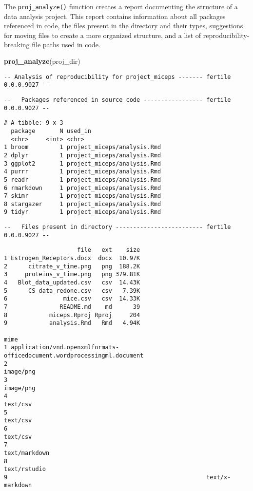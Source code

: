 \documentclass[12pt,twoside]{reedthesis}
\newenvironment{Shaded}{\begin{snugshade}}{\end{snugshade}}
\newcommand{\KeywordTok}[1]{\textcolor[rgb]{0.13,0.29,0.53}{\textbf{#1}}}
\newcommand{\NormalTok}[1]{#1}
\begin{document}
The \texttt{proj\_analyze()} function creates a report documenting the
structure of a data analysis project. This report contains information
about all packages referenced in code, the files present in the
directory and their types, suggestions for moving files to create a more
organized structure, and a list of reproducibility-breaking file paths
used in code.
\begin{Shaded}
\begin{Highlighting}[]
\KeywordTok{proj_analyze}\NormalTok{(proj_dir)}
\end{Highlighting}
\end{Shaded}
\begin{verbatim}
-- Analysis of reproducibility for project_miceps ------- fertile 0.0.0.9027 --
\end{verbatim}
\begin{verbatim}
--   Packages referenced in source code ----------------- fertile 0.0.0.9027 --
\end{verbatim}
\begin{verbatim}
# A tibble: 9 x 3
  package       N used_in                    
  <chr>     <int> <chr>                      
1 broom         1 project_miceps/analysis.Rmd
2 dplyr         1 project_miceps/analysis.Rmd
3 ggplot2       1 project_miceps/analysis.Rmd
4 purrr         1 project_miceps/analysis.Rmd
5 readr         1 project_miceps/analysis.Rmd
6 rmarkdown     1 project_miceps/analysis.Rmd
7 skimr         1 project_miceps/analysis.Rmd
8 stargazer     1 project_miceps/analysis.Rmd
9 tidyr         1 project_miceps/analysis.Rmd
\end{verbatim}
\begin{verbatim}
--   Files present in directory ------------------------- fertile 0.0.0.9027 --
\end{verbatim}
\begin{verbatim}
                     file   ext    size
1 Estrogen_Receptors.docx  docx  10.97K
2      citrate_v_time.png   png  188.2K
3     proteins_v_time.png   png 379.81K
4   Blot_data_updated.csv   csv  14.43K
5      CS_data_redone.csv   csv   7.39K
6                mice.csv   csv  14.33K
7               README.md    md      39
8            miceps.Rproj Rproj     204
9            analysis.Rmd   Rmd   4.94K
                                                                     mime
1 application/vnd.openxmlformats-officedocument.wordprocessingml.document
2                                                               image/png
3                                                               image/png
4                                                                text/csv
5                                                                text/csv
6                                                                text/csv
7                                                           text/markdown
8                                                            text/rstudio
9                                                         text/x-markdown
\end{verbatim}
\end{document}
